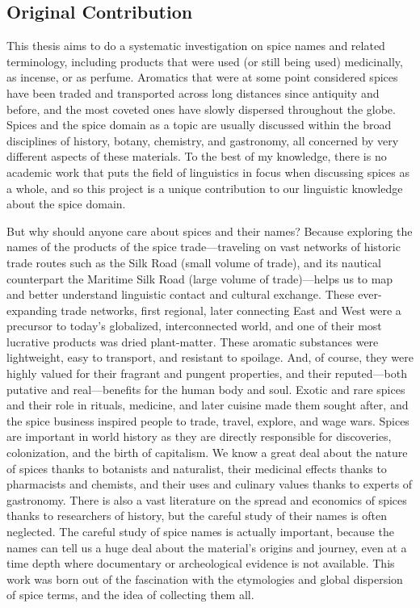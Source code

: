 \subsection{Original Contribution}

This thesis aims to do a systematic investigation on spice names and related terminology, including products that were used (or still being used) medicinally, as incense, or as perfume. Aromatics that were at some point considered spices have been traded and transported across long distances since antiquity and before, and the most coveted ones have slowly dispersed throughout the globe. Spices and the spice domain as a topic are usually discussed within the broad disciplines of history, botany, chemistry, and gastronomy, all concerned by very different aspects of these materials. To the best of my knowledge, there is no academic work that puts the field of linguistics in focus when discussing spices as a whole, and so this project is a unique contribution to our linguistic knowledge about the spice domain.

But why should anyone care about spices and their names? Because exploring the names of the products of the spice trade---traveling on vast networks of historic trade routes such as the Silk Road (small volume of trade), and its nautical counterpart the Maritime Silk Road (large volume of trade)---helps us to map and better understand linguistic contact and cultural exchange. These ever-expanding trade networks, first regional, later connecting East and West were a precursor to today's globalized, interconnected world, and one of their most lucrative products was dried plant-matter. These aromatic substances were lightweight, easy to transport, and resistant to spoilage. And, of course, they were highly valued for their fragrant and pungent properties, and their reputed---both putative and real---benefits for the human body and soul. Exotic and rare spices and their role in rituals, medicine, and later cuisine made them sought after, and the spice business inspired people to trade, travel, explore, and wage wars. Spices are important in world history as they are directly responsible for discoveries, colonization, and the birth of capitalism. We know a great deal about the nature of spices thanks to botanists and naturalist, their medicinal effects thanks to pharmacists and chemists, and their uses and culinary values thanks to experts of gastronomy. There is also a vast literature on the spread and economics of spices thanks to researchers of history, but the careful study of their names is often neglected. The careful study of spice names is actually important, because the names can tell us a huge deal about the material's origins and journey, even at a time depth where documentary or archeological evidence is not available. This work was born out of the fascination with the etymologies and global dispersion of spice terms, and the idea of collecting them all.

